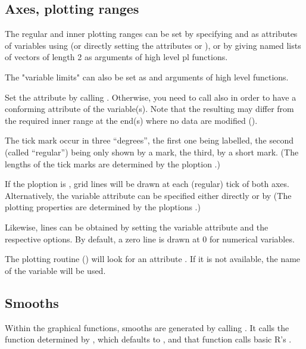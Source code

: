\documentclass[11pt]{article}\usepackage[]{graphicx}\usepackage[]{color}
\begin{document}
\subsection{Axes, plotting ranges}

The regular and inner plotting ranges can be set by specifying
 and  as attributes of variables using 
 (or directly setting the attributes 
 or ),
or by giving named lists of vectors of length 2
as arguments of high level pl functions.

The "variable limits"  can also be set as
 and  arguments of high level functions.

Set the  attribute by calling . 
Otherwise, you need to call also  in order to have a conforming
 attribute of the variable(s).
Note that the resulting  may differ from the required 
inner range at the end(s) where no data are modified ().


The tick mark occur in three ``degrees'', the first one being labelled,
the second (called ``regular'') being only shown by a mark, the third, 
by a short mark.
(The lengths of the tick marks are determined by the ploption .)

If the ploption  is , grid lines will be drawn at each (regular)
tick of both axes. 
Alternatively, the variable attribute  can be specified either 
directly or by 
(The plotting properties  are determined by the ploptions
.)

Likewise, lines can be obtained by setting the variable attribute 
and the respective options. By default, a zero line is drawn at 0 for
numerical variables.

The plotting routine () will look for an attribute .
If it is not available, the name of the variable will be used.

\subsection{Smooths}

Within the graphical functions, smooths are generated by calling 
. It calls the function determined by
, which defaults to , and that
function calls basic R's .
\end{document}
